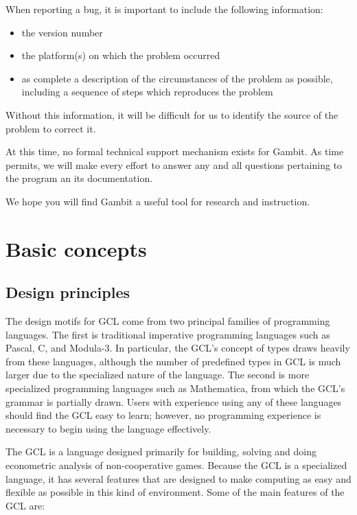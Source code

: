 When reporting a bug, it is important to include the following
information:

\begin{itemize}
\item the version number
\item the platform(s) on which the problem occurred
\item as complete a description of the circumstances of the problem as
possible, including a sequence of steps which reproduces the problem
\end{itemize}
 
\noindent 
Without this information, it will be difficult for us to
identify the source of the problem to correct it.

At this time, no formal technical support mechanism exists for Gambit.
As time permits, we will make every effort to answer any and all
questions pertaining to the program an its documentation.

We hope you will find Gambit a useful tool for research and
instruction.

\chapter{Basic concepts}

\section{Design principles}
The design motifs for GCL come from two principal families of
programming languages.  The first is traditional imperative
programming languages such as Pascal, C, and Modula-3.  In particular,
the GCL's concept of types draws heavily from these languages,
although the number of predefined types in GCL is much larger due to
the specialized nature of the language.  The second is more
specialized programming languages such as Mathematica, from which the
GCL's grammar is partially drawn.  Users with experience using any of
these languages should find the GCL easy to learn; however, no
programming experience is necessary to begin using the language
effectively.

The GCL is a language designed primarily for building, solving and
doing econometric analysis of non-cooperative games.  Because the GCL is a
specialized language, it has several features that are designed to
make computing as easy and flexible as possible in this kind of
environment.  Some of the main features of the GCL are:

